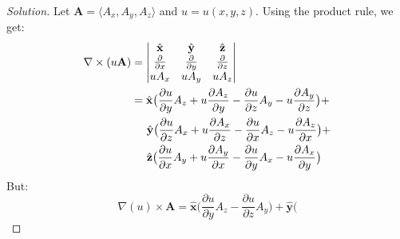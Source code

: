 \documentclass[crop=false,class=book,oneside]{standalone}
\begin{document}
            \begin{proof}[Solution]
                Let $\mathbf{A}=\langle{A_{x},A_{y},A_{z}}\rangle$
                and $u=u(x,y,z)$.
                Using the product rule, we get:
                \begin{align*}
                    \nabla\times (u\mathbf{A})
                    &=
                    \begin{vmatrix}
                        \hat{\mathbf{x}}
                        &\hat{\mathbf{y}}
                        &\hat{\mathbf{z}}\\
                        \frac{\partial}{\partial{x}}
                        &\frac{\partial}{\partial{y}}
                        &\frac{\partial}{\partial{z}}\\
                        uA_{x}
                        &uA_{y}
                        &uA_{z}
                    \end{vmatrix}\\
                    &=\hat{\mathbf{x}}\big(
                        \frac{\partial{u}}{\partial{y}}A_{z}
                        +u\frac{\partial{A_{z}}}{\partial{y}}
                        -\frac{\partial{u}}{\partial{z}}A_{y}
                        -u\frac{\partial{A_{y}}}{\partial{z}}
                    \big)+\\
                    &\hspace{1.4em}\hat{\mathbf{y}}\big(
                        \frac{\partial{u}}{\partial{z}}A_{x}
                        +u\frac{\partial{A_{x}}}{\partial{z}}
                        -\frac{\partial{u}}{\partial{x}}A_{z}
                        -u\frac{\partial{A_{z}}}{\partial{x}}
                    \big)+\\
                    &\hspace{1.4em}
                    \hat{\mathbf{z}}\big(
                        \frac{\partial{u}}{\partial{x}}A_{y}+
                        u\frac{\partial{A_{y}}}{\partial{x}}
                        -\frac{\partial{u}}{\partial{y}}A_{x}
                        -u\frac{\partial{A_{x}}}{\partial{y}}
                    \big)
                \end{align*}
                But:
                \begin{equation*}
                    \nabla(u)\times\mathbf{A}
                    =\hat{\mathbf{x}}\big(
                        \frac{\partial u}{\partial y}
                        A_{z}-\frac{\partial u}{\partial z}A_{y}
                    \big)
                    +\hat{\mathbf{y}}\big(

\end{equation*}
\end{proof}
\end{document}
